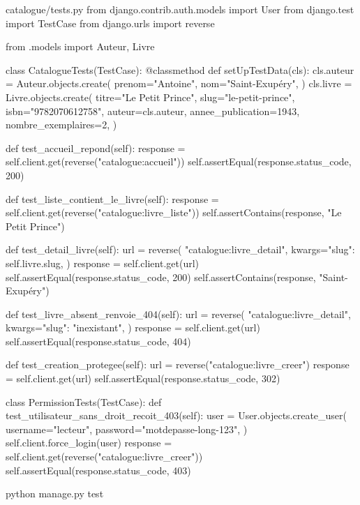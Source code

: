 \begin{codebox}[python]{catalogue/tests.py}
from django.contrib.auth.models import User
from django.test import TestCase
from django.urls import reverse

from .models import Auteur, Livre


class CatalogueTests(TestCase):
    @classmethod
    def setUpTestData(cls):
        cls.auteur = Auteur.objects.create(
            prenom="Antoine",
            nom="Saint-Exupéry",
        )
        cls.livre = Livre.objects.create(
            titre="Le Petit Prince",
            slug="le-petit-prince",
            isbn="9782070612758",
            auteur=cls.auteur,
            annee_publication=1943,
            nombre_exemplaires=2,
        )

    def test_accueil_repond(self):
        response = self.client.get(reverse("catalogue:accueil"))
        self.assertEqual(response.status_code, 200)

    def test_liste_contient_le_livre(self):
        response = self.client.get(reverse("catalogue:livre_liste"))
        self.assertContains(response, "Le Petit Prince")

    def test_detail_livre(self):
        url = reverse(
            "catalogue:livre_detail",
            kwargs={"slug": self.livre.slug},
        )
        response = self.client.get(url)
        self.assertEqual(response.status_code, 200)
        self.assertContains(response, "Saint-Exupéry")

    def test_livre_absent_renvoie_404(self):
        url = reverse(
            "catalogue:livre_detail",
            kwargs={"slug": "inexistant"},
        )
        response = self.client.get(url)
        self.assertEqual(response.status_code, 404)

    def test_creation_protegee(self):
        url = reverse("catalogue:livre_creer")
        response = self.client.get(url)
        self.assertEqual(response.status_code, 302)


class PermissionTests(TestCase):
    def test_utilisateur_sans_droit_recoit_403(self):
        user = User.objects.create_user(
            username="lecteur",
            password="motdepasse-long-123",
        )
        self.client.force_login(user)
        response = self.client.get(reverse("catalogue:livre_creer"))
        self.assertEqual(response.status_code, 403)
\end{codebox}

\begin{terminal}
python manage.py test
\end{terminal}

